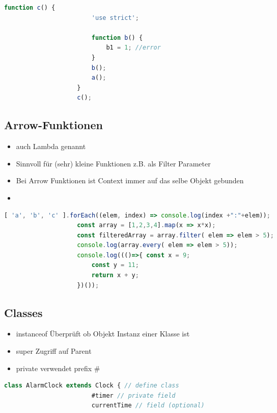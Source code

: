 \documentclass[a4paper, landscape, 8pt]{scrartcl}
\begin{document}
\begin{multicols*}{4}
\begin{lstlisting}[language=JavaScript]
                    function c() {
                        'use strict';

                        function b() {
                            b1 = 1; //error
                        }
                        b();
                        a();
                    }
                    c();
        \end{lstlisting}

        \subsection{Arrow-Funktionen}
        \begin{itemize}
            \item auch Lambda genannt
            \item Sinnvoll für (sehr) kleine Funktionen z.B. als Filter Parameter
            \item Bei Arrow Funktionen ist Context immer auf das selbe Objekt gebunden
            \item
        \end{itemize}

        \begin{lstlisting}[language=JavaScript]
                    [ 'a', 'b', 'c' ].forEach((elem, index) => console.log(index +":"+elem));
                    const array = [1,2,3,4].map(x => x*x);
                    const filteredArray = array.filter( elem => elem > 5);
                    console.log(array.every( elem => elem > 5));
                    console.log((()=>{ const x = 9;
                        const y = 11;
                        return x + y;
                    })());
        \end{lstlisting}

        \subsection{Classes}
        \begin{itemize}
            \item instanceof
            \subitem Überprüft ob Objekt Instanz einer Klasse ist
            \item super
            \subitem Zugriff auf Parent
            \item private verwendet prefix \#
        \end{itemize}

        \begin{lstlisting}[language=JavaScript]
                    class AlarmClock extends Clock { // define class
                        #timer // private field
                        currentTime // field (optional)


\end{lstlisting}
\end{multicols*}
\end{document}
